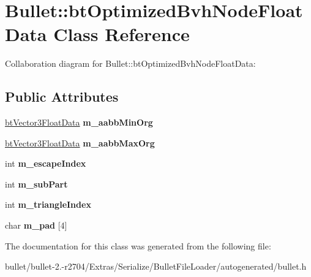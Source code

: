 \hypertarget{class_bullet_1_1bt_optimized_bvh_node_float_data}{\section{Bullet\+:\+:bt\+Optimized\+Bvh\+Node\+Float\+Data Class Reference}
\label{class_bullet_1_1bt_optimized_bvh_node_float_data}
}


Collaboration diagram for Bullet\+:\+:bt\+Optimized\+Bvh\+Node\+Float\+Data\+:
\subsection*{Public Attributes}
\begin{DoxyCompactItemize}
\item 
\hypertarget{class_bullet_1_1bt_optimized_bvh_node_float_data_a96cc48e8d6e4332993a97aa6ff992640}{\hyperlink{class_bullet_1_1bt_vector3_float_data}{bt\+Vector3\+Float\+Data} {\bfseries m\+\_\+aabb\+Min\+Org}}\label{class_bullet_1_1bt_optimized_bvh_node_float_data_a96cc48e8d6e4332993a97aa6ff992640}

\item 
\hypertarget{class_bullet_1_1bt_optimized_bvh_node_float_data_a5eb0f5f1e6a048b521a26f5fc8c3c7a6}{\hyperlink{class_bullet_1_1bt_vector3_float_data}{bt\+Vector3\+Float\+Data} {\bfseries m\+\_\+aabb\+Max\+Org}}\label{class_bullet_1_1bt_optimized_bvh_node_float_data_a5eb0f5f1e6a048b521a26f5fc8c3c7a6}

\item 
\hypertarget{class_bullet_1_1bt_optimized_bvh_node_float_data_a0eba9b267857a7cf54175cb9fef8d10d}{int {\bfseries m\+\_\+escape\+Index}}\label{class_bullet_1_1bt_optimized_bvh_node_float_data_a0eba9b267857a7cf54175cb9fef8d10d}

\item 
\hypertarget{class_bullet_1_1bt_optimized_bvh_node_float_data_aa7e49c198ea2c01d1ab152aa1d906a4a}{int {\bfseries m\+\_\+sub\+Part}}\label{class_bullet_1_1bt_optimized_bvh_node_float_data_aa7e49c198ea2c01d1ab152aa1d906a4a}

\item 
\hypertarget{class_bullet_1_1bt_optimized_bvh_node_float_data_a82198a0db4135f4d516336c23dfc8860}{int {\bfseries m\+\_\+triangle\+Index}}\label{class_bullet_1_1bt_optimized_bvh_node_float_data_a82198a0db4135f4d516336c23dfc8860}

\item 
\hypertarget{class_bullet_1_1bt_optimized_bvh_node_float_data_a0303dc8738b1cf0a64cf21aa2e18efa1}{char {\bfseries m\+\_\+pad} \mbox{[}4\mbox{]}}\label{class_bullet_1_1bt_optimized_bvh_node_float_data_a0303dc8738b1cf0a64cf21aa2e18efa1}

\end{DoxyCompactItemize}


The documentation for this class was generated from the following file\+:\begin{DoxyCompactItemize}
\item 
bullet/bullet-\/2.-\/r2704/\+Extras/\+Serialize/\+Bullet\+File\+Loader/autogenerated/bullet.\+h\end{DoxyCompactItemize}
